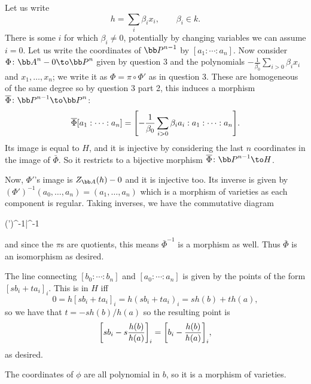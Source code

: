 \benum
    \item Let us write
    $$ h = \sum_i\beta_ix_i,\qquad \beta_i\in k . $$
    There is some $i$ for which $\beta_i\neq0$, potentially by changing variables we can assume $i=0$.
    Let us write the coordinates of $\bP^{n-1}$ by $[a_1:\cdots:a_n]$.
    Now consider $\Phi\colon\bA^n-0\to\bP^n$ given by question 3 and the polynomials $-\frac1{\beta_0}\sum_{i>0}\beta_ix_i$ and $x_1,\dots,x_n$; we write it as $\Phi=\pi\circ\Phi'$ as
    in question 3.
    These are homogeneous of the same degree so by question 3 part 2, this induces a morphism $\bar\Phi\colon\bP^{n-1}\to\bP^n$:
    $$ {\overline{\Phi}}[a_1:\cdots:a_n] = \mathopen{}\mathclose{\left[-{{1}\over{\beta_0}}\sum_{i>0}\beta_ia_i:a_1:\cdots:a_n\right]} . $$
    Its image is equal to $H$, and it is injective by considering the last $n$ coordinates in the image of $\bar\Phi$.
    So it restricts to a bijective morphism $\bar\Phi\colon\bP^{n-1}\to H$.

    Now, $\Phi'$'s image is $Z_\bA(h)-0$ and it is injective too.
    Its inverse is given by $(\Phi')^{-1}(a_0,\dots,a_n)=(a_1,\dots,a_n)$ which is a morphism of varieties as each component is regular.
    Taking inverses, we have the commutative diagram

        {(\Phi')^{-1}}{\bar\Phi^{-1}}{\pi}{\pi}

    and since the $\pi$s are quotients, this means $\bar\Phi^{-1}$ is a morphism as well.
    Thus $\bar\Phi$ is an isomorphism as desired.

    \item The line connecting $[b_0:\cdots:b_n]$ and $[a_0:\cdots:a_n]$ is given by the points of the form $[sb_i+ta_i]_i$.
    This is in $H$ iff
    $$ 0 = h[sb_i+ta_i]_i = h(sb_i+ta_i)_i = sh(b) + th(a) , $$
    so we have that $t=-sh(b)/h(a)$ so the resulting point is
    $$ \mathopen{}\mathclose{\left[sb_i - s{{h(b)}\over{h(a)}}\right]}_i = \mathopen{}\mathclose{\left[b_i - {{h(b)}\over{h(a)}}\right]}_i , $$
    as desired.

    The coordinates of $\phi$ are all polynomial in $b$, so it is a morphism of varieties.
\eenum

\bye

